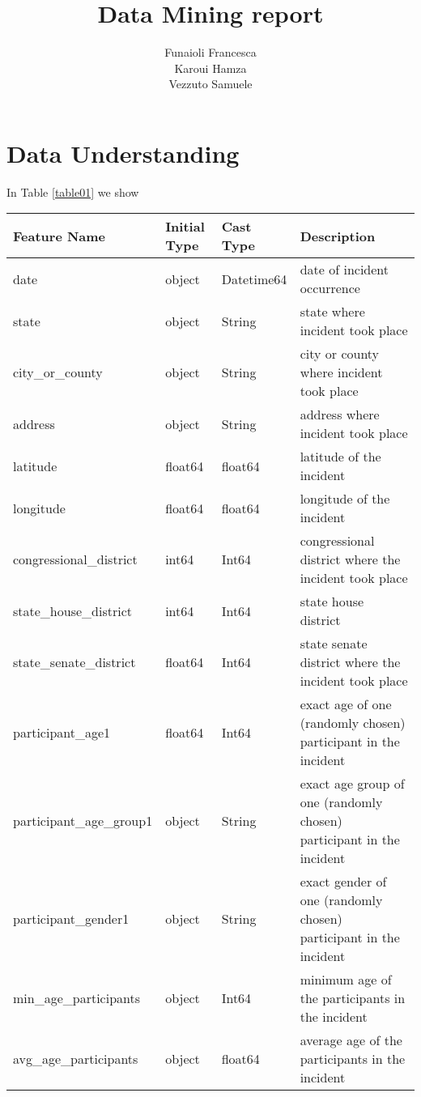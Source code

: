 \documentclass[10pt,a4paper]{report}
\title{\huge{\textbf{Data Mining report}}}
\author{Funaioli Francesca\\
Karoui Hamza\\
Vezzuto Samuele}
\begin{document}
\maketitle
\tableofcontents

\chapter{Data Understanding}

In Table \ref{table01} we show

\begin{table}
	\centering
	\begin{tabular}{|l|l|l|p{7cm}|}
		\hline
		Feature Name & Initial Type & Cast Type & Description\\
		\hline
		date & object & Datetime64 & date of incident occurrence\\
		\hline
		state & object & String & state where incident took place\\
		\hline
		city\_or\_county & object & String & city or county where incident took place\\
		\hline
		address & object & String & address where incident took place\\
		\hline
		latitude & float64 & float64 & latitude of the incident\\
		\hline
		longitude & float64 & float64 & longitude of the incident\\
		\hline
		congressional\_district & int64 & Int64 & congressional district where the incident took place\\
		\hline
		state\_house\_district & int64 & Int64 & state house district\\
		\hline
		state\_senate\_district & float64 & Int64 & state senate district where the incident took place\\
		\hline
		participant\_age1 & float64 & Int64 & exact age of one (randomly chosen) participant in the incident\\
		\hline
		participant\_age\_group1 & object & String & exact age group of one (randomly chosen) participant in the incident\\
		\hline
		participant\_gender1 & object & String & exact gender of one (randomly chosen) participant in the incident\\
		\hline
		min\_age\_participants & object & Int64 & minimum age of the participants in the incident\\
		\hline
		avg\_age\_participants & object & float64 & average age of the participants in the incident\\

\end{tabular}
\end{table}
\end{document}
